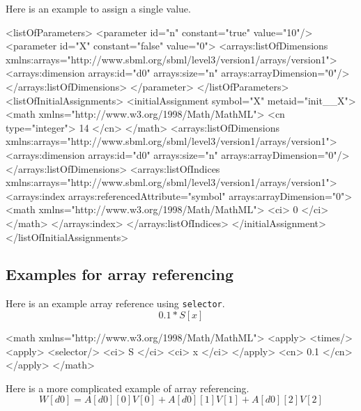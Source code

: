 Here is an example to assign a single value. 

\begin{example}
    
<listOfParameters>
    <parameter id="n" constant="true" value="10"/>
    <parameter id="X" constant="false" value="0">
        <arrays:listOfDimensions
            xmlns:arrays="http://www.sbml.org/sbml/level3/version1/arrays/version1">
            <arrays:dimension arrays:id="d0" arrays:size="n" arrays:arrayDimension="0"/>
        </arrays:listOfDimensions>
    </parameter>
</listOfParameters>
<listOfInitialAssignments>
    <initialAssignment symbol="X" metaid="init__X">
        <math xmlns="http://www.w3.org/1998/Math/MathML">
            <cn type="integer"> 14 </cn>
        </math>
        <arrays:listOfDimensions
            xmlns:arrays="http://www.sbml.org/sbml/level3/version1/arrays/version1">
            <arrays:dimension arrays:id="d0" arrays:size="n" arrays:arrayDimension="0"/>
        </arrays:listOfDimensions>
        <arrays:listOfIndices
            xmlns:arrays="http://www.sbml.org/sbml/level3/version1/arrays/version1">
            <arrays:index arrays:referencedAttribute="symbol" arrays:arrayDimension="0">
                <math xmlns="http://www.w3.org/1998/Math/MathML">
                    <ci> 0 </ci>
                </math>
            </arrays:index>
        </arrays:listOfIndices>
    </initialAssignment>
</listOfInitialAssignments>
\end{example}

\subsection{Examples for array referencing}

Here is an example array reference using {\tt selector}.
\begin{displaymath}
0.1 * S[x]
\end{displaymath}
\begin{example}
<math xmlns="http://www.w3.org/1998/Math/MathML">
    <apply>
        <times/>
        <apply>
            <selector/>
            <ci> S </ci>
            <ci> x </ci>
        </apply>
        <cn> 0.1 </cn>
    </apply>
</math>


\end{example}

Here is a more complicated example of array referencing.
\begin{displaymath}
W[d0]= A[d0][0]V[0]+ A[d0][1]V[1]+ A[d0][2]V[2]
\end{displaymath}

